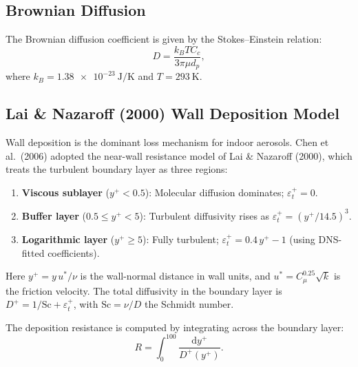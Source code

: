 \documentclass[12pt]{article}
\begin{document}
\subsection{Brownian Diffusion}

The Brownian diffusion coefficient is given by the Stokes--Einstein relation:
\begin{equation}
    D = \frac{k_B T C_c}{3 \pi \mu d_p}, \label{eq:brownian}
\end{equation}
where $k_B = \SI{1.38e-23}{\joule\per\kelvin}$ and $T = \SI{293}{\kelvin}$.

\subsection{Lai \& Nazaroff (2000) Wall Deposition Model}

Wall deposition is the dominant loss mechanism for indoor aerosols. Chen et al.~(2006) adopted the near-wall resistance model of Lai \& Nazaroff (2000), which treats the turbulent boundary layer as three regions:

\begin{enumerate}
    \item \textbf{Viscous sublayer} ($y^+ < 0.5$): Molecular diffusion dominates; $\varepsilon_t^+ = 0$.
    \item \textbf{Buffer layer} ($0.5 \le y^+ < 5$): Turbulent diffusivity rises as $\varepsilon_t^+ = (y^+ / 14.5)^3$.
    \item \textbf{Logarithmic layer} ($y^+ \ge 5$): Fully turbulent; $\varepsilon_t^+ = 0.4 \, y^+ - 1$ (using DNS-fitted coefficients).
\end{enumerate}

Here $y^+ = y \, u^* / \nu$ is the wall-normal distance in wall units, and $u^* = C_\mu^{0.25} \sqrt{k}$ is the friction velocity. The total diffusivity in the boundary layer is $D^+ = 1/\text{Sc} + \varepsilon_t^+$, with $\text{Sc} = \nu/D$ the Schmidt number.

The deposition resistance is computed by integrating across the boundary layer:
\begin{equation}
    R = \int_0^{100} \frac{\mathrm{d} y^+}{D^+(y^+)}.
\end{equation}
\end{document}
